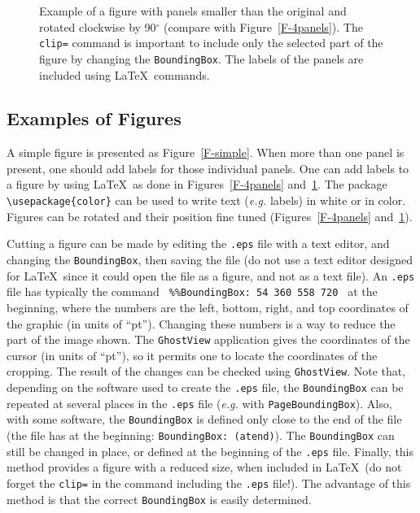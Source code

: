 \documentclass[namedreferences]{solarphysics}
\begin{document}
\begin{article}
\begin{figure}
{      \hspace{0.122\textwidth}  \color{black}{(b)}
      \hspace{0.122\textwidth}  \color{white}{(c)}
      \hspace{0.122\textwidth}  \color{white}{(d)}
         \hfill}
     \vspace{0.36\textwidth}    %
\caption{Example of a figure with panels smaller
than the original and rotated clockwise by 90$^{\circ}$ 
(compare with Figure~\ref{F-4panels}). The \texttt{clip=} 
command is important to include only the selected part of the figure 
by changing the \texttt{BoundingBox}. 
The labels of the panels are included using \LaTeX\ commands. 
        }
   \label{F-rotate-cut}
   \end{figure}
   

\subsection{Examples of Figures} %
  \label{S-figures}
 A simple figure is presented as Figure~\ref{F-simple}. When more
than one panel is present, one should add labels for those individual panels.
One can add labels to a figure by using \LaTeX\ as done
in Figures~\ref{F-4panels} and~\ref{F-rotate-cut}. 
The package \verb+\usepackage{color}+
can be used to write text ({\it e.g.} labels) in white or in color. 
Figures can be rotated and their position fine tuned 
(Figures~\ref{F-4panels} and~\ref{F-rotate-cut}).

  Cutting a figure can be made by editing the \texttt{.eps} 
file with a text editor, and changing the \texttt{BoundingBox}, 
then saving the file (do not use a text editor designed for \LaTeX\ since 
it could open the file as a figure, and not as a text file).
An \texttt{.eps} file has typically the command
\verb+ %%BoundingBox: 54 360 558 720 + 
at the beginning, where the numbers are the left, bottom, right, and top
coordinates of the graphic (in units of ``pt'').  
Changing these numbers is a way to reduce the part of the image shown. 
The \texttt{GhostView} application gives the coordinates
of the cursor (in units of ``pt''), so it permits one to locate the 
coordinates of the cropping. 
The result of the changes can be checked using \texttt{GhostView}. 
 Note that, depending on the software used to create the \texttt{.eps} file, 
the \texttt{BoundingBox} can be repeated at several places in the
\texttt{.eps} file ({\it e.g.} with \texttt{PageBoundingBox}). 
Also, with some software,
the \texttt{BoundingBox} is defined only close to the end of the file
(the file has at the beginning: \texttt{BoundingBox: (atend)}).
The \texttt{BoundingBox} can still be changed
in place, or defined at the beginning of the \texttt{.eps} file. 
   Finally, this method provides a figure with a reduced size, when
included in \LaTeX\ (do not forget the \texttt{clip=} 
in the command including the \texttt{.eps} file!).     
The advantage of this method is that the correct \texttt{BoundingBox}
is easily determined.


\end{article}
\end{document}
